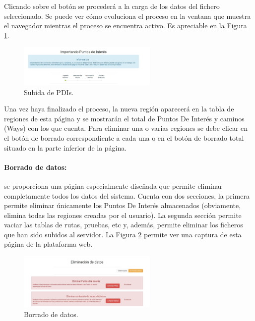 Clicando sobre el botón  se procederá a la carga de los datos del fichero seleccionado. Se puede ver cómo evoluciona el proceso en la ventana que muestra el navegador mientras el proceso se encuentra activo. Es apreciable en la Figura \ref{pdimanage2}.

\begin{figure}[h]
  \centering
    \includegraphics[width=0.6\textwidth]{../img/manualusuario/pdimanage2.jpg}
  \caption{Subida de PDIs.}
  \label{pdimanage2}
\end{figure}

Una vez haya finalizado el proceso, la nueva región aparecerá en la tabla de regiones de esta página y se mostrarán el total de Puntos De Interés y caminos (Ways) con los que cuenta. Para eliminar una o varias regiones se debe clicar en el botón de borrado correspondiente a cada una o en el botón de borrado total situado en la parte inferior de la página.

\paragraph{Borrado de datos:} se proporciona una página especialmente diseñada que permite eliminar completamente todos los datos del sistema. Cuenta con dos secciones, la primera permite eliminar únicamente los Puntos De Interés almacenados (obviamente, elimina todas las regiones creadas por el usuario). La segunda sección permite vaciar las tablas de rutas, pruebas, etc y, además, permite eliminar los ficheros que han sido subidos al servidor. La Figura \ref{deleteall} permite ver una captura de esta página de la plataforma web.

\begin{figure}[h]
  \centering
    \includegraphics[width=0.6\textwidth]{../img/manualusuario/deleteall.jpg}
  \caption{Borrado de datos.}
  \label{deleteall}
\end{figure}

